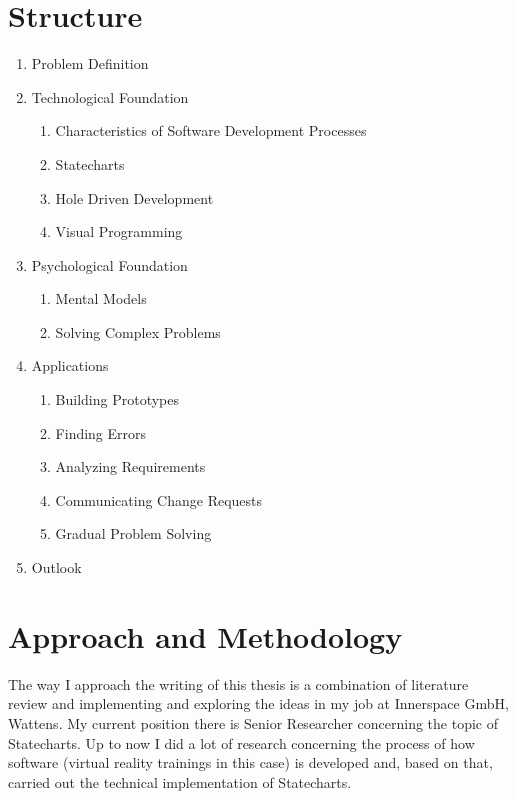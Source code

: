 \documentclass[a4paper, bibliography=totoc, oneside, 12pt]{scrbook}
\begin{document}
\section{Structure}
\begin{enumerate}[label*=\arabic*.]
    \item Problem Definition
    
    \item Technological Foundation
    \begin{enumerate}[label*=\arabic*.]
        \item Characteristics of Software Development Processes
        \item Statecharts %
        \item Hole Driven Development %
        \item Visual Programming
    \end{enumerate}
    
    \item Psychological Foundation
    \begin{enumerate}[label*=\arabic*.]
        \item Mental Models
        \item Solving Complex Problems
    \end{enumerate}
    
    \item Applications
    \begin{enumerate}[label*=\arabic*.]
        \item Building Prototypes
        \item Finding Errors
        \item Analyzing Requirements
        \item Communicating Change Requests
        \item Gradual Problem Solving
    \end{enumerate}
    
    \item Outlook
\end{enumerate}


\section{Approach and Methodology}
The way I approach the writing of this thesis is a combination of literature review and implementing and exploring the ideas in my job at Innerspace GmbH, Wattens.
My current position there is Senior Researcher concerning the topic of Statecharts.
Up to now I did a lot of research concerning the process of how software (virtual reality trainings in this case) is developed and, based on that, carried out the technical implementation of Statecharts.
\end{document}
